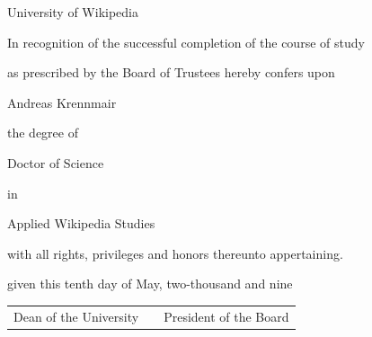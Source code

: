 \documentclass[a4paper,12pt,landscape]{article}
\newcommand{\HEADER}{\fontsize{80}{80}}
\newcommand{\HUGE}{\fontsize{50}{80}}
\newcommand{\thefont}{\pgothfamily}
\begin{document}
\begin{center}
{\HEADER \thefont University of Wikipedia}

{\LARGE \thefont In recognition of the successful completion of the course of study}

{\LARGE \thefont as prescribed by the Board of Trustees hereby confers upon}

{\HUGE \thefont Andreas Krennmair}

{\LARGE \thefont the degree of}

{\HUGE \thefont Doctor of Science}

{\LARGE \thefont in}

{\HUGE \thefont Applied Wikipedia Studies}

{\LARGE \thefont with all rights, privileges and honors thereunto appertaining.}

{\LARGE \thefont given this tenth day of May, two-thousand and nine}

\end{center}

\vspace{1cm}
\begin{tabularx}{\textwidth}[b]{lXr} \cline{1-1} \cline{3-3}
{\large \thefont Dean of the University} & & {\large \thefont President of the Board}
\end{tabularx}
\end{document}
